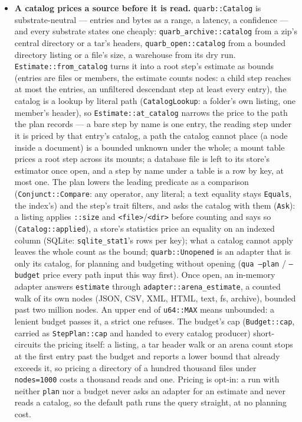 \documentclass{report}
\begin{document}
\begin{itemize}
\item \textbf{A catalog prices a source before it is read.}
  \texttt{quarb::Catalog} is substrate-neutral — entries and
  bytes as a range, a latency, a confidence — and every substrate
  states one cheaply: \texttt{quarb\_archive::catalog} from a
  zip's central directory or a tar's headers, \texttt{quarb\_open::catalog}
  from a bounded directory listing or a file's size, a warehouse
  from its dry run. \texttt{Estimate::from\_catalog} turns it
  into a root step's estimate as bounds (entries are files or
  members, the estimate counts nodes: a child step reaches at most the
  entries, an unfiltered descendant step at least every entry),
  the catalog is a lookup by literal path
  (\texttt{CatalogLookup}: a folder's own listing, one member's
  header), so \texttt{Estimate::at\_catalog} narrows the price
  to the path the plan records — a bare step by name is one entry,
  the reading step under it is priced by that entry's catalog, a
  path the catalog cannot place (a node inside a document) is a
  bounded unknown under the whole; a mount table prices a root
  step across its mounts; a database file is left to its store's
  estimator once open, and a step by name under a table is a row
  by key, at most one. The plan lowers the leading predicate as a
  comparison (\texttt{Conjunct::Compare}: any operator, any
  literal; a text equality stays \texttt{Equals}, the index's) and
  the step's trait filters, and asks the catalog with them
  (\texttt{Ask}): a listing applies \texttt{::size} and
  \texttt{<file>}/\texttt{<dir>} before counting and says so
  (\texttt{Catalog::applied}), a store's statistics price an
  equality on an indexed column (SQLite: \texttt{sqlite\_stat1}'s
  rows per key); what a catalog cannot apply leaves the whole
  count as the bound; \texttt{quarb::Unopened} is an adapter
  that is only its catalog, for planning and budgeting without
  opening (\texttt{qua --plan} / \texttt{--budget} price every
  path input this way first). Once open, an in-memory adapter
  answers \texttt{estimate} through \texttt{adapter::arena\_estimate},
  a counted walk of its own nodes (JSON, CSV, XML, HTML, text,
  fs, archive), bounded past two million nodes. An upper end of
  \texttt{u64::MAX} means unbounded: a lenient budget passes it, a
  strict one refuses. The budget's cap (\texttt{Budget::cap},
  carried as \texttt{StepPlan::cap} and handed to every catalog
  producer) short-circuits the pricing itself: a listing, a tar
  header walk or an arena count stops at the first entry past the
  budget and reports a lower bound that already exceeds it, so
  pricing a directory of a hundred thousand files under
  \texttt{nodes=1000} costs a thousand reads and one. Pricing is
  opt-in: a run with neither \texttt{plan} nor a budget never
  asks an adapter for an estimate and never reads a catalog, so
  the default path runs the query straight, at no planning cost.


\end{itemize}
\end{document}
